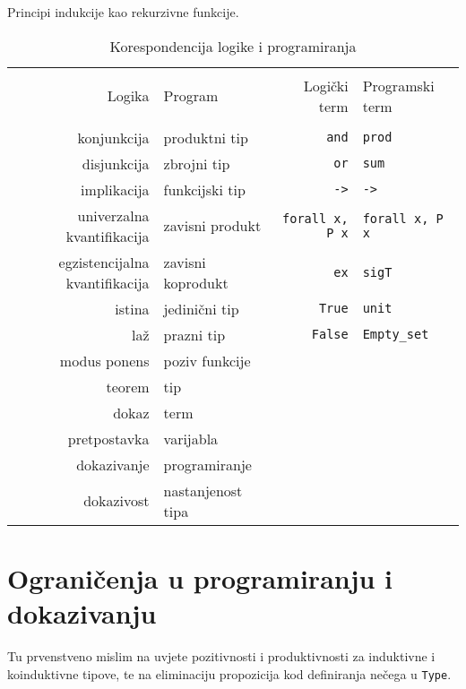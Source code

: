 Principi indukcije kao rekurzivne funkcije.
\begin{table}[hbt]
  \centering
  \begin{tabular}[hbt]{rlrl}
    \toprule \\
    Logika & Program & Logički term & Programski term \\
    \midrule \\
    konjunkcija & produktni tip  & \texttt{and} & \texttt{prod} \\
    disjunkcija & zbrojni tip & \texttt{or} & \texttt{sum} \\
    implikacija & funkcijski tip & \texttt{->} & \texttt{->} \\
    univerzalna kvantifikacija & zavisni produkt & \texttt{forall x, P x} & \texttt{forall x, P x} \\
    egzistencijalna kvantifikacija & zavisni koprodukt & \texttt{ex} & \texttt{sigT} \\
    istina & jedinični tip & \texttt{True} & \texttt{unit} \\
    laž & prazni tip & \texttt{False} & \texttt{Empty\_set} \\
    modus ponens & poziv funkcije &  &  \\
    teorem & tip & & \\
    dokaz & term & & \\
    pretpostavka & varijabla & & \\
    dokazivanje & programiranje & & \\
    dokazivost & nastanjenost tipa & & \\
    \bottomrule
  \end{tabular}
  \caption{Korespondencija logike i programiranja}\label{tab:curryhoward}
\end{table}

\section{Ograničenja u programiranju i dokazivanju}\label{sec:ogranicenja}
Tu prvenstveno mislim na uvjete pozitivnosti i produktivnosti za induktivne i koinduktivne tipove,
te na eliminaciju propozicija kod definiranja nečega u \texttt{Type}.

